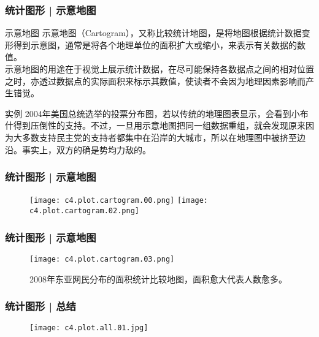 \begin{frame}
  \frametitle{统计图形 | 示意地图}
  \begin{block}{示意地图}
示意地图（Cartogram），又称比较统计地图，是将地图根据统计数据变形得到示意图，通常是将各个地理单位的面积扩大或缩小，来表示有关数据的数值。\\
\vspace{0.5em}
示意地图的用途在于视觉上展示统计数据，在尽可能保持各数据点之间的相对位置之时，亦透过数据点的实际面积来标示其数值，使读者不会因为地理因素影响而产生错觉。
  \end{block}
  \pause
  \begin{block}{实例}
2004年美国总统选举的投票分布图，若以传统的地理图表显示，会看到小布什得到压倒性的支持。不过，一旦用示意地图把同一组数据重组，就会发现原来因为大多数支持民主党的支持者都集中在沿岸的大城市，所以在地理图中被挤至边沿。事实上，双方的确是势均力敌的。
  \end{block}
\end{frame}

\begin{frame}
  \frametitle{统计图形 | 示意地图}
  \begin{figure}
    \centering
    \texttt{[image: c4.plot.cartogram.00.png]}
    \texttt{[image: c4.plot.cartogram.02.png]}
  \end{figure}
\end{frame}

\begin{frame}
  \frametitle{统计图形 | 示意地图}
  \begin{figure}
    \centering
    \texttt{[image: c4.plot.cartogram.03.png]}
    \caption{2008年东亚网民分布的面积统计比较地图，面积愈大代表人数愈多。}
  \end{figure}
\end{frame}

\begin{frame}
  \frametitle{统计图形 | 总结}
  \begin{figure}
    \centering
    \texttt{[image: c4.plot.all.01.jpg]}
  \end{figure}
\end{frame}

